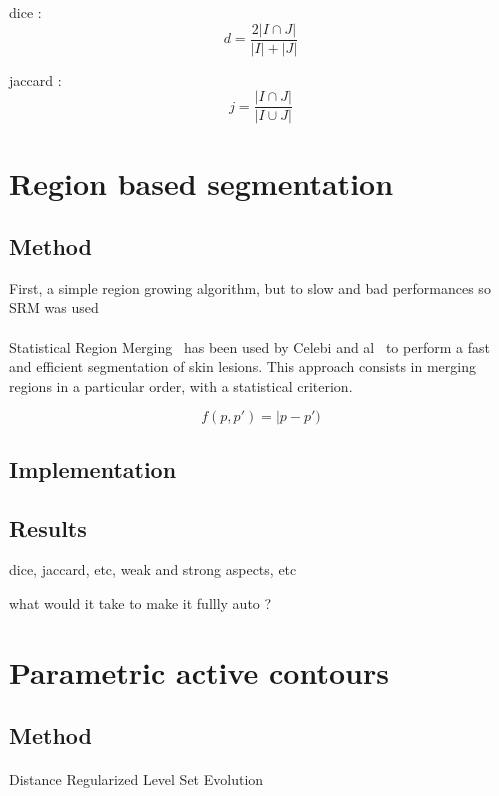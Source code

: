 \documentclass[a4paper,10pt]{article}
\begin{document}
dice :
\begin{equation} \label{eq:dice}
d=\frac{2|I \cap J|}{|I| + |J|} 
\end{equation}

jaccard :
\begin{equation} \label{eq:jaccard}
j=\frac{|I \cap J|}{|I \cup J|} 
\end{equation}

\section{Region based segmentation}
\subsection{Method}
First, a simple region growing algorithm, but to slow and bad performances so SRM was used
\paragraph{} Statistical Region Merging~\cite{nock_statistical_2004} has been 
used by Celebi and al~\cite{celebi_border_2008} to perform a fast and efficient 
segmentation of skin lesions. This approach consists in merging regions in a particular order, with a statistical criterion.

$$
f(p,p')=|p-p')
$$
\subsection{Implementation}

\subsection{Results}
dice, jaccard, etc, weak and strong aspects, etc

what would it take to make it fullly auto ?

\section{Parametric active contours}
\subsection{Method}
\paragraph{}  Distance Regularized Level Set Evolution \cite{li2010distance} 
\end{document}

